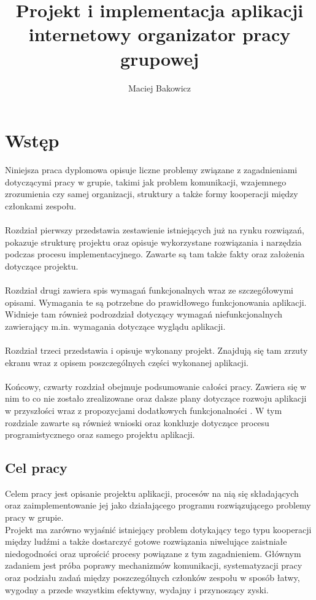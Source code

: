 \documentclass[eng,printmode]{mgr}
\title{Projekt i implementacja aplikacji internetowy organizator pracy grupowej }
\author{Maciej Bakowicz}
\begin{document}


\maketitle 

\tableofcontents 

\chapter{Wstęp}  
Niniejsza praca dyplomowa opisuje liczne problemy związane z zagadnieniami dotyczącymi pracy w grupie, takimi jak problem komunikacji, wzajemnego zrozumienia czy samej organizacji, struktury a także formy kooperacji między członkami zespołu.
\\ \\
Rozdział pierwszy przedstawia zestawienie istniejących już na rynku rozwiązań, pokazuje strukturę projektu oraz opisuje wykorzystane rozwiązania i narzędzia podczas procesu implementacyjnego. Zawarte są tam także fakty oraz założenia dotyczące projektu.
\\ \\
Rozdział drugi zawiera spis wymagań funkcjonalnych wraz ze szczegółowymi opisami. Wymagania te są potrzebne do prawidłowego funkcjonowania aplikacji. Widnieje tam również podrozdział dotyczący wymagań niefunkcjonalnych zawierający m.in. wymagania dotyczące wyglądu aplikacji.
\\ \\
Rozdział trzeci przedstawia i opisuje wykonany projekt. Znajdują się tam zrzuty ekranu wraz z opisem poszczególnych części wykonanej aplikacji.
\\ \\
Końcowy, czwarty rozdział obejmuje podsumowanie całości pracy. Zawiera się w nim to co nie zostało zrealizowane oraz dalsze plany dotyczące rozwoju aplikacji w przyszłości wraz z propozycjami dodatkowych funkcjonalności . W tym rozdziale zawarte są również wnioski oraz konkluzje dotyczące procesu programistycznego oraz samego projektu aplikacji.

\section{Cel pracy}
Celem pracy jest opisanie projektu aplikacji, procesów na nią się składających oraz zaimplementowanie jej jako działającego programu rozwiązującego problemy pracy w grupie.
\\
Projekt ma zarówno wyjaśnić istniejący problem dotykający tego typu kooperacji między ludźmi a także dostarczyć gotowe rozwiązania niwelujące zaistniałe niedogodności oraz uprościć procesy powiązane z tym zagadnieniem. Głównym zadaniem jest próba poprawy mechanizmów komunikacji, systematyzacji pracy oraz podziału zadań między poszczególnych członków zespołu w sposób łatwy, wygodny a przede wszystkim efektywny, wydajny i przynoszący zyski.
\end{document}
